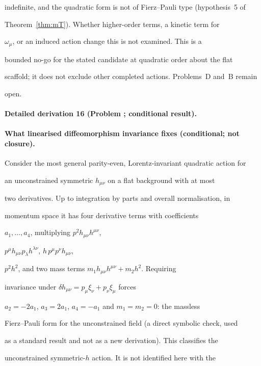 indefinite, and the quadratic form is not of Fierz--Pauli type (hypothesis~5 of

Theorem~\ref{thm:mT}). Whether higher-order terms, a kinetic term for

\(\omega_\mu\), or an induced action change this is not examined. This is a

bounded no-go for the stated candidate at quadratic order about the flat

scaffold; it does not exclude other completed actions. Problems~D and~B remain

open.



\paragraph{Detailed derivation 16 (Problem ; conditional result).} \label{ref:detail-15} %



\paragraph{What linearised diffeomorphism invariance fixes (conditional; not closure).}

Consider the most general parity-even, Lorentz-invariant quadratic action for

an unconstrained symmetric \(h_{\mu\nu}\) on a flat background with at most

two derivatives. Up to integration by parts and overall normalisation, in

momentum space it has four derivative terms with coefficients

\(a_1,\dots,a_4\), multiplying \(p^2h_{\mu\nu}h^{\mu\nu}\),

\(p^\mu h_{\mu\nu}p_\lambda h^{\lambda\nu}\), \(h\,p^\mu p^\nu h_{\mu\nu}\),

\(p^2h^2\), and two mass terms \(m_1h_{\mu\nu}h^{\mu\nu}+m_2h^2\). Requiring

invariance under \(\delta h_{\mu\nu}=p_\mu\xi_\nu+p_\nu\xi_\mu\) forces

\(a_2=-2a_1\), \(a_3=2a_1\), \(a_4=-a_1\) and \(m_1=m_2=0\): the massless

Fierz--Pauli form for the unconstrained field (a direct symbolic check, used

as a standard result and not as a new derivation). This classifies the

unconstrained symmetric-\(h\) action. It is not identified here with the


